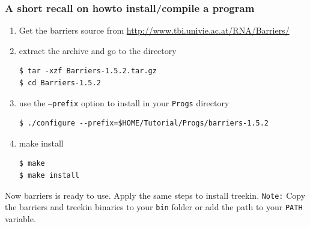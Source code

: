 \documentclass[a4paper]{article}
\newcommand{\frametitle}[1]{\subsubsection{#1}}
\begin{document}
\frametitle{A short recall on howto install/compile a program}
\begin{enumerate}
	\item Get the barriers source from \url{http://www.tbi.univie.ac.at/RNA/Barriers/}
	\item extract the archive and go to the directory
\begin{verbatim}
$ tar -xzf Barriers-1.5.2.tar.gz
$ cd Barriers-1.5.2
\end{verbatim}
	\item use the \texttt{--prefix} option to install in your \texttt{Progs} directory
\begin{verbatim}
$ ./configure --prefix=$HOME/Tutorial/Progs/barriers-1.5.2
\end{verbatim}
	\item make install
\begin{verbatim}
$ make
$ make install
\end{verbatim}
\end{enumerate}

Now barriers is ready to use. Apply the same steps to install treekin.
\texttt{Note:} Copy the barriers and treekin binaries to your \texttt{bin}
folder or add the path to your \texttt{PATH} variable.
\end{document}

